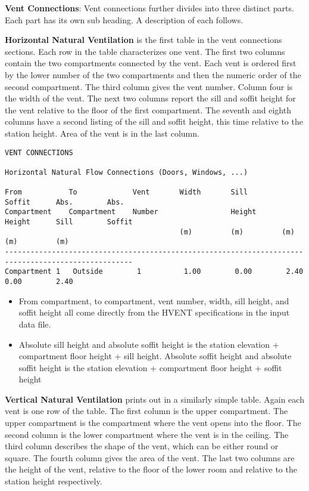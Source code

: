 \textbf{Vent Connections}: Vent connections further divides into three distinct parts.  Each part has its own sub heading.  A description of each follows.

\textbf{Horizontal Natural Ventilation} is the first table in the vent connections sections.  Each row in the table characterizes one vent.  The first two columns contain the two compartments connected by the vent.  Each vent is ordered first by the lower number of the two compartments and then the numeric order of the second compartment.  The third column gives the vent number.  Column four is the width of the vent.  The next two columns report the sill and soffit height for the vent relative to the floor of the first compartment.  The seventh and eighth columns have a second listing of the sill and soffit height, this time relative to the station height.  Area of the vent is in the last column.

\begin{lstlisting}[basicstyle=\tiny]
VENT CONNECTIONS

Horizontal Natural Flow Connections (Doors, Windows, ...)

From           To             Vent       Width       Sill        Soffit      Abs.        Abs.
Compartment    Compartment    Number                 Height      Height      Sill        Soffit
                                         (m)         (m)         (m)         (m)         (m)
----------------------------------------------------------------------------------------------------
Compartment 1   Outside        1          1.00        0.00        2.40        0.00        2.40
\end{lstlisting}

\begin{itemize}
\item From compartment, to compartment, vent number, width, sill height, and soffit height all come directly from the HVENT specifications in the input data file.
\item Absolute sill height and absolute soffit height is the station elevation + compartment floor height + sill height. Absolute soffit height and absolute soffit height is the station elevation + compartment floor height + soffit height
\end{itemize}

\textbf{Vertical Natural Ventilation} prints out in a similarly simple table.  Again each vent is one row of the table.  The first column is the upper compartment.  The upper compartment is the compartment where the vent opens into the floor.  The second column is the lower compartment where the vent is in the ceiling.  The third column describes the shape of the vent, which can be either round or square.  The fourth column gives the area of the vent.  The last two columns are the height of the vent, relative to the floor of the lower room and relative to the station height respectively.

